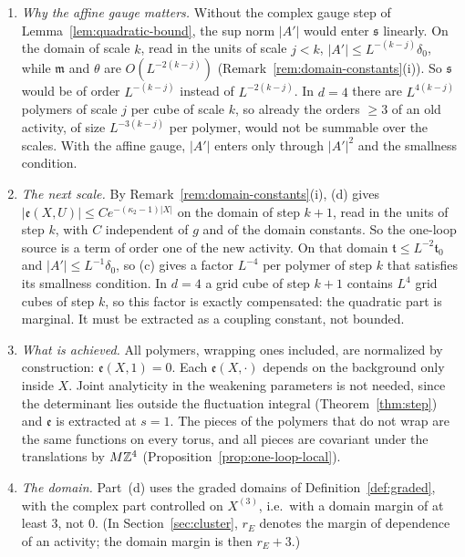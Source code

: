 \begin{remark}\label{rem:one-loop-polymer}
\begin{enumerate}[label=(\alph*)]
\item \emph{Why the affine gauge matters.} Without the complex gauge step of Lemma~\ref{lem:quadratic-bound}, the sup norm $|A'|$ would enter $\mathfrak s$ linearly. On the domain of scale $k$, read in the units of scale $j<k$, $|A'|\le L^{-(k-j)}\delta_0$, while $\mathfrak m$ and $\theta$ are $O(L^{-2(k-j)})$ (Remark~\ref{rem:domain-constants}(i)). So $\mathfrak s$ would be of order $L^{-(k-j)}$ instead of $L^{-2(k-j)}$. In $d=4$ there are $L^{4(k-j)}$ polymers of scale $j$ per cube of scale $k$, so already the orders $\ge3$ of an old activity, of size $L^{-3(k-j)}$ per polymer, would not be summable over the scales. With the affine gauge, $|A'|$ enters only through $|A'|^2$ and the smallness condition.
\item \emph{The next scale.} By Remark~\ref{rem:domain-constants}(i), (d) gives $|\mathfrak e(X,U)|\le Ce^{-(\kappa_2-1)|X|}$ on the domain of step $k+1$, read in the units of step $k$, with $C$ independent of $g$ and of the domain constants. So the one-loop source is a term of order one of the new activity. On that domain $\mathfrak t\le L^{-2}\mathfrak t_0$ and $|A'|\le L^{-1}\delta_0$, so (c) gives a factor $L^{-4}$ per polymer of step $k$ that satisfies its smallness condition. In $d=4$ a grid cube of step $k+1$ contains $L^4$ grid cubes of step $k$, so this factor is exactly compensated: the quadratic part is marginal. It must be extracted as a coupling constant, not bounded.
\item \emph{What is achieved.} All polymers, wrapping ones included, are normalized by construction: $\mathfrak e(X,1)=0$. Each $\mathfrak e(X,\cdot)$ depends on the background only inside $X$. Joint analyticity in the weakening parameters is not needed, since the determinant lies outside the fluctuation integral (Theorem~\ref{thm:step}) and $\mathfrak e$ is extracted at $s=1$. The pieces of the polymers that do not wrap are the same functions on every torus, and all pieces are covariant under the translations by $M\mathbb Z^4$ (Proposition~\ref{prop:one-loop-local}).
\item \emph{The domain.} Part~(d) uses the graded domains of Definition~\ref{def:graded}, with the complex part controlled on $X^{(3)}$, i.e.\ with a domain margin of at least $3$, not $0$. (In Section~\ref{sec:cluster}, $r_E$ denotes the margin of dependence of an activity; the domain margin is then $r_E+3$.)

\end{enumerate}
\end{remark}
